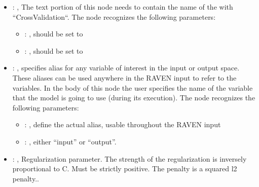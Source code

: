 \begin{itemize}
\begin{itemize}
        \item {}: ,
          List of IDs of features/variables to include in the transformation process.

        \item {}: ,
          Which space to search? Target or Feature?
      \end{itemize}

    \item {}: ,
      The text portion of this node needs to contain the name of the  with
               ``CrossValidation``.
      The  node recognizes the following parameters:
        \begin{itemize}
          \item {}: ,
            should be set to 
          \item {}: ,
            should be set to 
      \end{itemize}

    \item {}: ,
      specifies alias for         any variable of interest in the input or output space. These
      aliases can be used anywhere in the RAVEN input to         refer to the variables. In the body
      of this node the user specifies the name of the variable that the model is going to use
      (during its execution).
      The  node recognizes the following parameters:
        \begin{itemize}
          \item {}: ,
            define the actual alias, usable throughout the RAVEN input
          \item {}: ,
            either ``input'' or ``output''.
      \end{itemize}

    \item {}: ,
      Regularization parameter. The strength of the regularization is inversely
      proportional to C.                                                            Must be strictly
      positive. The penalty is a squared l2 penalty..


\end{itemize}

